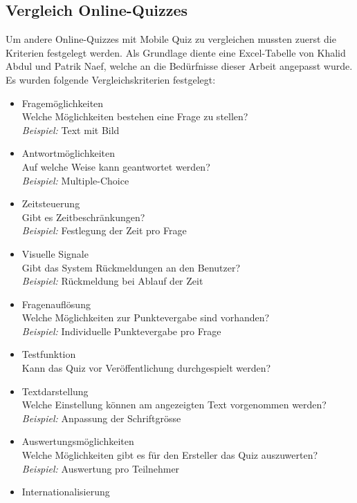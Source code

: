 	\subsection{Vergleich Online-Quizzes}
	\label{subsec:Webuntersuchungen}
	Um andere Online-Quizzes mit Mobile Quiz zu vergleichen mussten zuerst die Kriterien festgelegt werden. Als Grundlage diente eine Excel-Tabelle von Khalid Abdul und Patrik Naef, welche an die Bedürfnisse dieser Arbeit angepasst wurde. Es wurden folgende Vergleichskriterien festgelegt:
	\begin{itemize}
		\item Fragemöglichkeiten \\
		Welche Möglichkeiten bestehen eine Frage zu stellen? \\
		\textit{Beispiel:} Text mit Bild
		\item Antwortmöglichkeiten \\
		Auf welche Weise kann geantwortet werden? \\
		\textit{Beispiel:} Multiple-Choice
		\item Zeitsteuerung \\
		Gibt es Zeitbeschränkungen? \\
		\textit{Beispiel:} Festlegung der Zeit pro Frage
		\item Visuelle Signale \\
		Gibt das System Rückmeldungen an den Benutzer? \\
		\textit{Beispiel:} Rückmeldung bei Ablauf der Zeit
		\item Fragenauflösung \\
		Welche Möglichkeiten zur Punktevergabe sind vorhanden? \\
		\textit{Beispiel:} Individuelle Punktevergabe pro Frage
		\item Testfunktion \\
		Kann das Quiz vor Veröffentlichung durchgespielt werden? \\
		\item Textdarstellung \\
		Welche Einstellung können am angezeigten Text vorgenommen werden? \\
		\textit{Beispiel:} Anpassung der  Schriftgrösse
		\item Auswertungsmöglichkeiten \\
		Welche Möglichkeiten gibt es für den Ersteller das Quiz auszuwerten? \\
		\textit{Beispiel:} Auswertung pro Teilnehmer
		\item Internationalisierung \\

\end{itemize}
